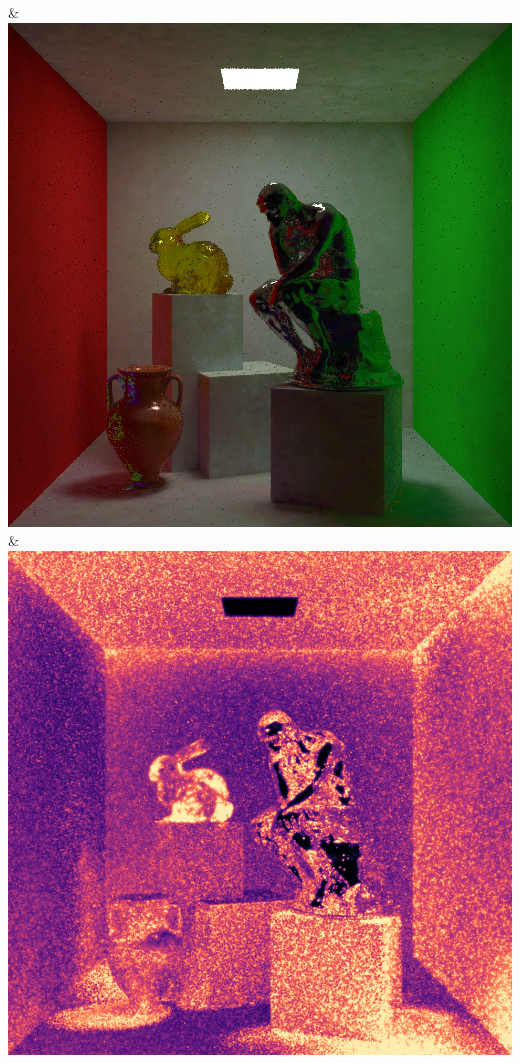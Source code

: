 & \includegraphics[width=\linewidth]{figures/py/tests/path_termination/bthk9_1spp_thinker.png}
\\
& \includegraphics[width=\linewidth]{figures/py/tests/path_termination/ref_1spp_thinker_flip.png}
